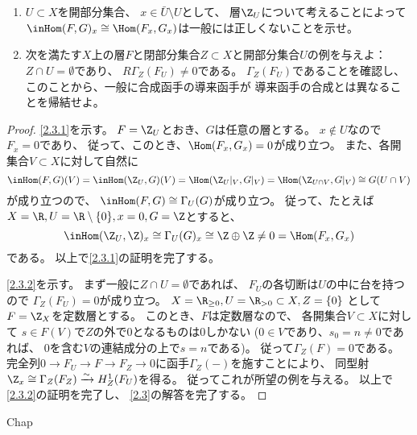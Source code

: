 \documentclass[uplatex,dvipdfmx]{jsarticle}
\begin{document}
\maketitle
\HeaderCommentA
\section{}
\fi

\begin{prob}\label{2.3}
  \begin{enumerate}
    \item \label{2.3.1}
    \(U\subset X\)を開部分集合、
    \(x\in\bar{U}\setminus U\)として、
    層\(\Z_U\)について考えることによって
    \(\inHom(F,G)_x\cong \Hom(F_x,G_x)\)は一般には正しくないことを示せ。
    \item \label{2.3.2}
    次を満たす\(X\)上の層\(F\)と閉部分集合\(Z\subset X\)と開部分集合\(U\)の例を与えよ：
    \(Z\cap U=\emptyset\)であり、
    \(R\Gamma_Z(F_U)\neq 0\)である。
    \(\Gamma_Z(F_U)\)であることを確認し、
    このことから、一般に合成函手の導来函手が
    導来函手の合成とは異なることを帰結せよ。
  \end{enumerate}
\end{prob}

\begin{proof}
  \ref{2.3.1}を示す。
  \(F=\Z_U\)とおき、\(G\)は任意の層とする。
  \(x\not\in U\)なので\(F_x=0\)であり、
  従って、このとき、\(\Hom(F_x,G_x)=0\)が成り立つ。
  また、各開集合\(V\subset X\)に対して自然に
  \[
  \inHom(F,G)(V) = \inHom(\Z_U,G)(V) = \Hom(\Z_U|_V,G|_V)
  = \Hom(\Z_{U\cap V},G|_V) \cong G(U\cap V)
  \]
  が成り立つので、
  \(\inHom(F,G)\cong \Gamma_U(G)\)が成り立つ。
  従って、たとえば\(X=\R,U=\R\setminus \{0\},x=0,G=\Z\)とすると、
  \[
  \inHom(\Z_U,\Z)_x \cong \Gamma_U(G)_x
  \cong \Z\oplus\Z \neq 0 = \Hom(F_x,G_x)
  \]
  である。
  以上で\ref{2.3.1}の証明を完了する。

  \ref{2.3.2}を示す。
  まず一般に\(Z\cap U=\emptyset\)であれば、
  \(F_U\)の各切断は\(U\)の中に台を持つので
  \(\Gamma_Z(F_U)=0\)が成り立つ。
  \(X=\R_{\geq 0}, U=\R_{>0}\subset X, Z=\{0\}\)
  として\(F=\Z_X\)を定数層とする。
  このとき、\(F\)は定数層なので、
  各開集合\(V\subset X\)に対して
  \(s\in F(V)\)で\(Z\)の外で\(0\)となるものは\(0\)しかない
  (\(0\in V\)であり、\(s_0=n\neq 0\)であれば、
  \(0\)を含む\(V\)の連結成分の上で\(s=n\)である)。
  従って\(\Gamma_Z(F)=0\)である。
  完全列\(0\to F_U\to F\to F_Z\to 0\)に函手\(\Gamma_Z(-)\)を施すことにより、
  同型射
  \(\Z_x \cong \Gamma_Z(F_Z)\xrightarrow{\sim} H^1_Z(F_U)\)を得る。
  従ってこれが所望の例を与える。
  以上で\ref{2.3.2}の証明を完了し、
  \autoref{2.3}の解答を完了する。
\end{proof}





\ifcsname Chap\endcsname\else
\printbibliography
\end{document}
